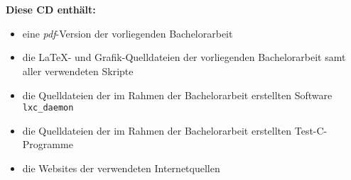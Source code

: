 \chapter*{}
\thispagestyle{empty}

\begin{center}
  \vspace{-3cm}
\end{center}

\vfill

\textbf{Diese CD enthält:}
\begin{itemize}
 \item eine \emph{pdf}-Version der vorliegenden Bachelorarbeit
 \item die \LaTeX- und Grafik-Quelldateien der vorliegenden Bachelorarbeit samt aller verwendeten Skripte
 \item die Quelldateien der im Rahmen der Bachelorarbeit erstellten Software \texttt{lxc\_daemon}
 \item die Quelldateien der im Rahmen der Bachelorarbeit erstellten Test-C-Programme
 \item die Websites der verwendeten Internetquellen
\end{itemize}

